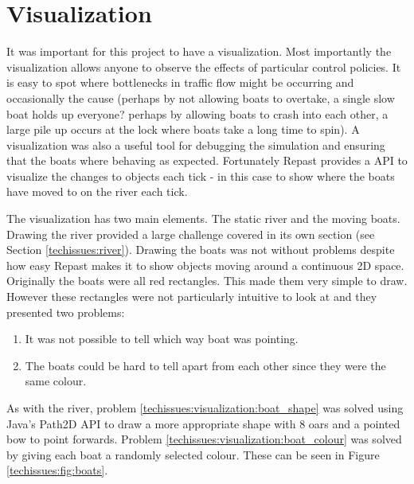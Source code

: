     \section{Visualization}
      It was important for this project to have a visualization. Most importantly the visualization allows anyone to observe the effects of particular control policies. It is easy to spot where bottlenecks in traffic flow might be occurring and occasionally the cause (perhaps by not allowing boats to overtake, a single slow boat holds up everyone? perhaps by allowing boats to crash into each other, a large pile up occurs at the lock where boats take a long time to spin). A visualization was also a useful tool for debugging the simulation and ensuring that the boats where behaving as expected. Fortunately Repast provides a API to visualize the changes to objects each tick - in this case to show where the boats have moved to on the river each tick.

      The visualization has two main elements. The static river and the moving boats. Drawing the river provided a large challenge covered in its own section (see Section \ref{techissues:river}). Drawing the boats was not without problems despite how easy Repast makes it to show objects moving around a continuous 2D space. Originally the boats were all red rectangles. This made them very simple to draw. However these rectangles were not particularly intuitive to look at and they presented two problems:
      \begin{enumerate}
        \item \label{techissues:visualization:boat_shape} It was not possible to tell which way boat was pointing.
        \item \label{techissues:visualization:boat_colour} The boats could be hard to tell apart from each other since they were the same colour. 
      \end{enumerate}
      As with the river, problem \ref{techissues:visualization:boat_shape} was solved using Java's Path2D API to draw a more appropriate shape with 8 oars and a pointed bow to point forwards. Problem \ref{techissues:visualization:boat_colour} was solved by giving each boat a randomly selected colour. These can be seen in Figure \ref{techissues:fig:boats}.

